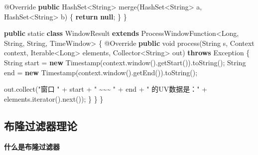 \documentclass[cn,11pt,chinese]{elegantbook}
\newenvironment{Shaded}{}{}
\newcommand{\AttributeTok}[1]{\textcolor[rgb]{0.49,0.56,0.16}{#1}}
\newcommand{\BuiltInTok}[1]{#1}
\newcommand{\DataTypeTok}[1]{\textcolor[rgb]{0.56,0.13,0.00}{#1}}
\newcommand{\FunctionTok}[1]{\textcolor[rgb]{0.02,0.16,0.49}{#1}}
\newcommand{\KeywordTok}[1]{\textcolor[rgb]{0.00,0.44,0.13}{\textbf{#1}}}
\newcommand{\NormalTok}[1]{#1}
\newcommand{\StringTok}[1]{\textcolor[rgb]{0.25,0.44,0.63}{#1}}
\begin{document}
\begin{Shaded}
\begin{Highlighting}[]
        \AttributeTok{@Override}
        \KeywordTok{public} \BuiltInTok{HashSet}\NormalTok{\textless{}}\BuiltInTok{String}\NormalTok{\textgreater{} }\FunctionTok{merge}\NormalTok{(}\BuiltInTok{HashSet}\NormalTok{\textless{}}\BuiltInTok{String}\NormalTok{\textgreater{} a, }\BuiltInTok{HashSet}\NormalTok{\textless{}}\BuiltInTok{String}\NormalTok{\textgreater{} b) \{}
            \KeywordTok{return} \KeywordTok{null}\NormalTok{;}
\NormalTok{        \}}
\NormalTok{    \}}

    \KeywordTok{public} \DataTypeTok{static} \KeywordTok{class}\NormalTok{ WindowResult }\KeywordTok{extends}\NormalTok{ ProcessWindowFunction\textless{}}\BuiltInTok{Long}\NormalTok{, }\BuiltInTok{String}\NormalTok{, }\BuiltInTok{String}\NormalTok{, TimeWindow\textgreater{} \{}
        \AttributeTok{@Override}
        \KeywordTok{public} \DataTypeTok{void} \FunctionTok{process}\NormalTok{(}\BuiltInTok{String}\NormalTok{ s, }\BuiltInTok{Context}\NormalTok{ context, }\BuiltInTok{Iterable}\NormalTok{\textless{}}\BuiltInTok{Long}\NormalTok{\textgreater{} elements, Collector\textless{}}\BuiltInTok{String}\NormalTok{\textgreater{} out) }\KeywordTok{throws} \BuiltInTok{Exception}\NormalTok{ \{}
            \BuiltInTok{String}\NormalTok{ start = }\KeywordTok{new} \BuiltInTok{Timestamp}\NormalTok{(context.}\FunctionTok{window}\NormalTok{().}\FunctionTok{getStart}\NormalTok{()).}\FunctionTok{toString}\NormalTok{();}
            \BuiltInTok{String}\NormalTok{ end = }\KeywordTok{new} \BuiltInTok{Timestamp}\NormalTok{(context.}\FunctionTok{window}\NormalTok{().}\FunctionTok{getEnd}\NormalTok{()).}\FunctionTok{toString}\NormalTok{();}

\NormalTok{            out.}\FunctionTok{collect}\NormalTok{(}\StringTok{"窗口 "}\NormalTok{ + start + }\StringTok{" \textasciitilde{}\textasciitilde{}\textasciitilde{} "}\NormalTok{ + end + }\StringTok{" 的UV数据是："}\NormalTok{ + elements.}\FunctionTok{iterator}\NormalTok{().}\FunctionTok{next}\NormalTok{());}
\NormalTok{        \}}
\NormalTok{    \}}
\NormalTok{\}}
\end{Highlighting}
\end{Shaded}

\hypertarget{ux5e03ux9686ux8fc7ux6ee4ux5668ux7406ux8bba}{%
\subsection{布隆过滤器理论}\label{ux5e03ux9686ux8fc7ux6ee4ux5668ux7406ux8bba}}

\textbf{什么是布隆过滤器}
\end{document}
